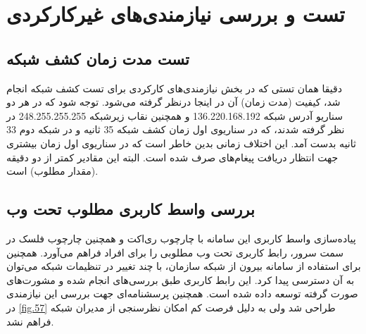 \cleardoublepage

\section{تست و بررسی نیازمندی‌های غیرکارکردی}


\subsection{تست مدت زمان کشف شبکه}

دقیقا همان تستی که در بخش نیازمندی‌های کارکردی برای تست کشف شبکه انجام شد، کیفیت (مدت زمان) آن در اینجا درنظر گرفته می‌شود. توجه شود که در هر دو سناریو آدرس شبکه 136.220.168.192 و همچنین نقاب زیرشبکه 248.255.255.255 در نظر گرفته شدند، که در سناریوی اول زمان کشف شبکه 35 ثانیه و در شبکه دوم 33 ثانیه بدست آمد. این اختلاف زمانی بدین خاطر است که در سناریوی اول زمان بیشتری جهت انتظار دریافت پیغام‌های  صرف شده است. البته این مقادیر کمتر از دو دقیقه (مقدار مطلوب) است.

\subsection{بررسی واسط کاربری مطلوب تحت وب}

پیاده‌سازی واسط کاربری این سامانه با چارچوب ری‌اکت و همچنین چارچوب فلسک در سمت سرور، رابط کاربری تحت وب مطلوبی را برای افراد فراهم می‌آورد. همچنین برای استفاده از سامانه بیرون از شبکه سازمان، با چند تغییر در تنظیمات شبکه می‌توان به آن دسترسی پیدا کرد. این رابط کاربری طبق بررسی‌های انجام شده و مشورت‌های صورت گرفته توسعه داده شده است. همچنین پرسشنامه‌ای جهت بررسی این نیازمندی در \cref{fig.57} طراحی شد ولی به دلیل فرصت کم امکان نظرسنجی از مدیران شبکه فراهم نشد.

